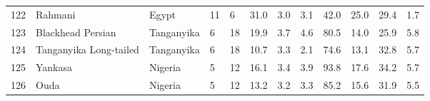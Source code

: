 \begin{center}
\begin{landscape}
\begin{longtable}{|p{0.4in}|p{0.9in}|p{0.7in}|p{0.5in}|p{0.5in}|p{0.5in}|p{0.5in}|p{0.5in}|p{0.5in}|p{0.5in}|p{0.5in}|p{0.5in}|}
 122 &  Rahmani &  Egypt & 11 &  6 & 31.0 & 3.0 & 3.1 & 42.0 & 25.0 & 29.4 & 1.7 \\ 
 123 &  Blackhead Persian &  Tanganyika &  6 &  18 & 19.9 & 3.7 & 4.6 & 80.5 & 14.0 & 25.9 & 5.8 \\ 
 124 &  Tanganyika Long-tailed &  Tanganyika &  6 &  18 & 10.7 & 3.3 & 2.1 & 74.6 & 13.1 & 32.8 & 5.7 \\ 
 125 &  Yankasa &  Nigeria &  5 &  12 & 16.1 & 3.4 & 3.9 & 93.8 & 17.6 & 34.2 & 5.7 \\ 
 126 &  Ouda &  Nigeria &  5 &  12 & 13.2 & 3.2 & 3.3 & 85.2 & 15.6 & 31.9 & 5.5 \\ 
   \hline

\end{longtable}
\end{landscape}
\end{center}
%


